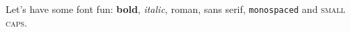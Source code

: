 \documentclass{article}
\begin{document}
	Let's have some font fun: \textbf{bold}, \textit{italic}, \textrm{roman}, \textsf{sans serif}, \texttt{monospaced} and \textsc{small caps}.
\end{document}
